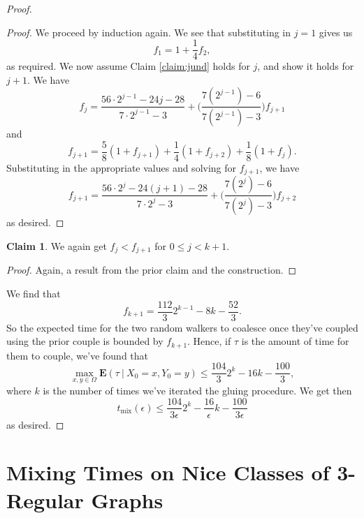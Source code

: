 \documentclass[10pt,a4paper]{amsart}
\theoremstyle{definition}
\numberwithin{definition}{section}
\newtheorem{claim}[definition]{Claim}
\begin{document}
\begin{proof}
\begin{proof}
We proceed by induction again. We see that substituting in $j=1$ gives us 
\[f_1 = 1 + \frac{1}{4}f_2, \]
as required. We now assume Claim \ref{claim:jund} holds for $j$, and show it holds for $j+1$. We have 
\[f_j =  \frac{56 \cdot 2^{j-1}-24j-28}{7 \cdot 2^{j-1}-3} + \bigg(\frac{7(2^{j-1})-6}{7(2^{j-1})-3}\bigg) f_{j+1}\]
and
\[f_{j+1} = \frac{5}{8}(1+f_{j+1}) + \frac{1}{4}(1+f_{j+2}) + \frac{1}{8}(1+f_j). \]
Substituting in the appropriate values and solving for $f_{j+1}$, we have
\[ f_{j+1} = \frac{56 \cdot 2^{j}-24(j+1)-28}{7 \cdot 2^{j}-3} + \bigg(\frac{7(2^{j})-6}{7(2^{j})-3}\bigg) f_{j+2} \]
as desired.
\end{proof}

\begin{claim}
We again get $f_j < f_{j+1}$ for $0 \leq j < k+1$.
\end{claim}

\begin{proof}
Again, a result from the prior claim and the construction.
\end{proof}

\noindent We find that 
\[f_{k+1} = \frac{112}{3} 2^{k-1} - 8k - \frac{52}{3}. \]
So the expected time for the two random walkers to coalesce once they've coupled using the prior couple is bounded by $f_{k+1}$. Hence, if $\tau$ is the amount of time for them to couple, we've found that 
\[\max_{x,y \in \Omega} \mathbf{E}(\tau \ | \ X_0 = x, Y_0 = y) \leq \frac{104}{3} 2^k - 16k - \frac{100}{3}, \]
where $k$ is the number of times we've iterated the gluing procedure. We get then
\[t_{\text{mix}}(\epsilon) \leq \frac{104}{3 \epsilon} 2^k - \frac{16}{\epsilon}k - \frac{100}{3 \epsilon} \]
as desired.
\end{proof}

\section{Mixing Times on Nice Classes of 3-Regular Graphs} \label{sec:four}
\end{document}
